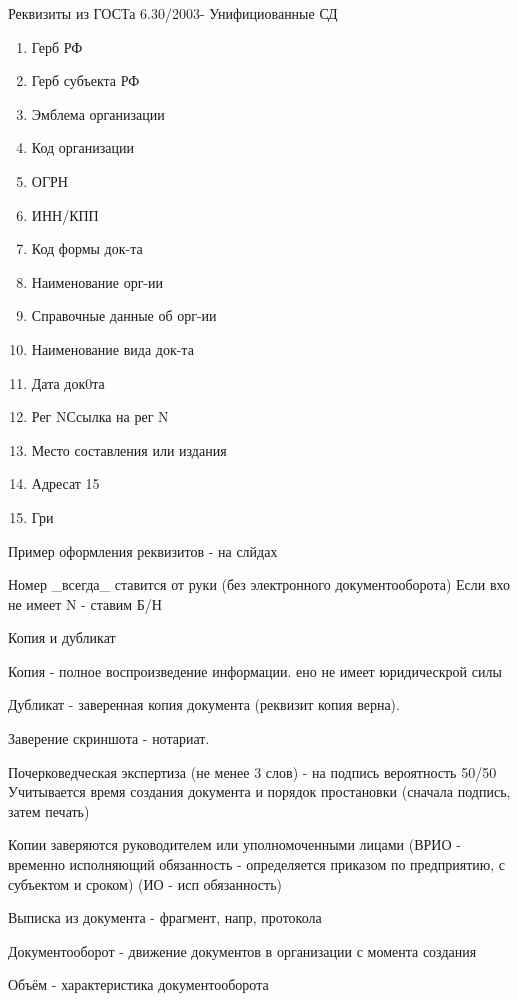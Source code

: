 \documentclass[a4paper,12pt]{report}
\begin{document}
		Реквизиты из ГОСТа 6.30/2003- Унифициованные СД
		\begin{enumerate}
		\item	Герб РФ
		\item	Герб субъекта РФ
		\item	Эмблема организации
		\item	Код организации
		\item	ОГРН
		\item	ИНН/КПП
		\item	Код формы док-та
		\item	Наименование орг-ии
		\item	Справочные данные об орг-ии
		\item	Наименование вида док-та
		\item	Дата док0та
		\item	Рег NСсылка на рег N
		\item	Место составления или издания
		\item	Адресат 15
		\item	Гри
		\end{enumerate}



		Пример оформления реквизитов - на слйдах

		Номер _всегда_ ставится от руки (без электронного документооборота)
		Если вхо не имеет N - ставим Б/Н



		Копия и дубликат

		Копия - полное воспроизведение информации. ено не имеет юридическрой силы

		Дубликат -  заверенная копия документа (реквизит копия верна).

		Заверение скриншота - нотариат.


		Почерковедческая экспертиза (не менее 3 слов) - на подпись вероятность 50/50
		Учитывается время создания документа и порядок простановки (сначала подпись, затем печать)

		Копии заверяются руководителем или уполномоченными лицами (ВРИО - временно исполняющий обязанность - определяется приказом по предприятию, с субъектом и сроком) (ИО - исп обязанность)

		Выписка из документа - фрагмент, напр, протокола



	Документооборот - движение документов в организации с момента создания


		Объём - характеристика документооборота
\end{document}
